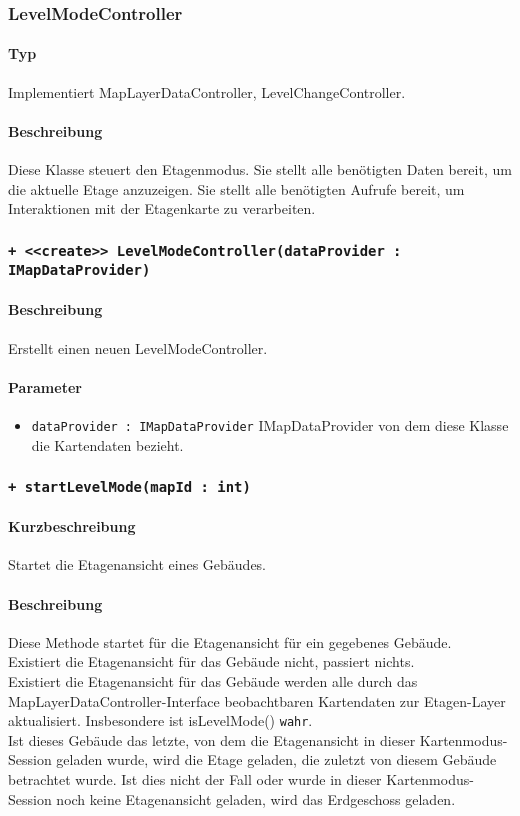 \subsubsection{LevelModeController}
\paragraph*{Typ}
Implementiert MapLayerDataController, LevelChangeController.
\paragraph*{Beschreibung}
Diese Klasse steuert den Etagenmodus. Sie stellt alle benötigten Daten bereit, um die aktuelle Etage anzuzeigen. 
Sie stellt alle benötigten Aufrufe bereit, um Interaktionen mit der Etagenkarte zu verarbeiten.

\subsubsection*{\texttt{+ <<create>> LevelModeController(dataProvider : IMapDataProvider)}}%
\paragraph*{Beschreibung}
Erstellt einen neuen LevelModeController.
\paragraph*{Parameter}
\begin{itemize}
    \item \texttt{dataProvider : IMapDataProvider} IMapDataProvider von dem diese Klasse die Kartendaten bezieht.
\end{itemize}

\subsubsection*{\texttt{+ startLevelMode(mapId : int)}}%
\paragraph*{Kurzbeschreibung}
Startet die Etagenansicht eines Gebäudes.
\paragraph*{Beschreibung}
Diese Methode startet für die Etagenansicht für ein gegebenes Gebäude.\\
Existiert die Etagenansicht für das Gebäude nicht, passiert nichts.\\
Existiert die Etagenansicht für das Gebäude werden alle durch das MapLayerDataController-Interface beobachtbaren 
Kartendaten zur Etagen-Layer aktualisiert. Insbesondere ist isLevelMode() \texttt{wahr}.\\
Ist dieses Gebäude das letzte, von dem die Etagenansicht in dieser Kartenmodus-Session geladen wurde, wird die 
Etage geladen, die zuletzt von diesem Gebäude betrachtet wurde.
Ist dies nicht der Fall oder wurde in dieser Kartenmodus-Session noch keine Etagenansicht geladen, wird das Erdgeschoss geladen.
